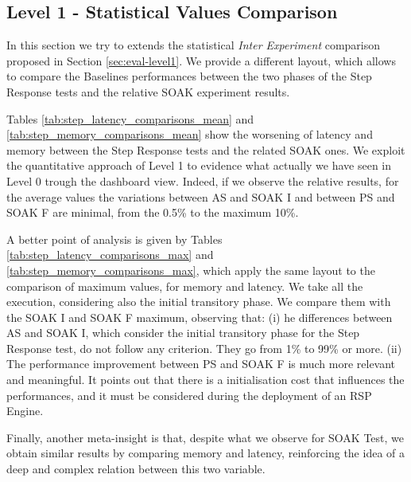 \subsection{Level 1 - Statistical Values Comparison}\label{sec:level1-step-stats}


In this section we try to extends the statistical \textit{Inter Experiment} comparison proposed in Section \ref{sec:eval-level1}. We provide a different layout, which allows to compare the Baselines performances between the two phases of the Step Response tests and the relative SOAK experiment results.

Tables \ref{tab:step_latency_comparisons_mean} and \ref{tab:step_memory_comparisons_mean} show the worsening of latency and memory between the Step Response tests and the related SOAK ones. We exploit the quantitative approach of Level 1 to evidence what actually we have seen in Level 0 trough the dashboard view. Indeed, if we observe the relative results, for the average values the variations between AS and SOAK I and between PS and SOAK F are minimal, from the 0.5\% to the maximum 10\%.

A better point of analysis is given by Tables \ref{tab:step_latency_comparisons_max} and \ref{tab:step_memory_comparisons_max}, which apply the same layout to the comparison of maximum values, for memory and latency. We take all the execution, considering also the initial transitory phase. We compare them with the SOAK I and SOAK F maximum, observing that: (i) he differences between AS and SOAK I, which consider the initial transitory phase for the Step Response test, do not follow any criterion. They go from 1\% to 99\% or more. (ii) The performance improvement between PS and SOAK F is much more relevant and meaningful. It points out that there is a initialisation cost that influences the performances, and it must be considered during the deployment of an RSP Engine.

Finally, another meta-insight is that, despite what we observe for SOAK Test, we obtain similar results by comparing memory and latency, reinforcing the idea of a deep and complex relation between this two variable.

